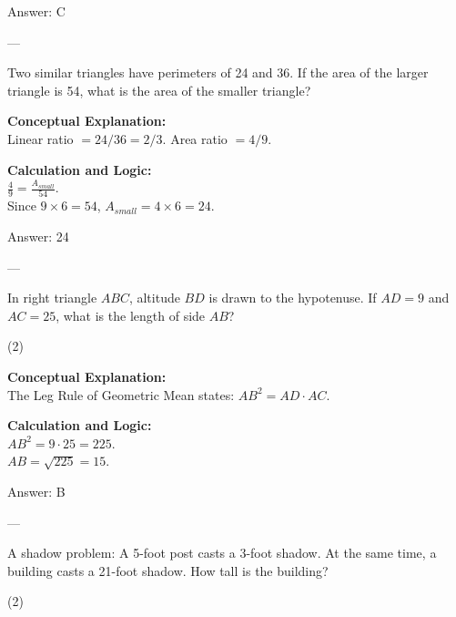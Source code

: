 \documentclass[11pt,paper=a4,answers]{exam}
\begin{document}
\begin{questions}
\begin{solution}
\vspace{15pt}
Answer: \colorbox{yellow!100}{C}
\end{solution}

---

\question
Two similar triangles have perimeters of 24 and 36. If the area of the larger triangle is 54, what is the area of the smaller triangle?

\begin{solution}
\textbf{Conceptual Explanation:} \\
Linear ratio $= 24/36 = 2/3$. Area ratio $= 4/9$.

\vspace{10pt}
\textbf{Calculation and Logic:} \\
$\frac{4}{9} = \frac{A_{small}}{54}$. \\
Since $9 \times 6 = 54$, $A_{small} = 4 \times 6 = 24$.

\vspace{15pt}
Answer: \colorbox{yellow!100}{24}
\end{solution}

---

\question
In right triangle $ABC$, altitude $BD$ is drawn to the hypotenuse. If $AD = 9$ and $AC = 25$, what is the length of side $AB$?
\begin{tasks}(2)
\end{tasks}

\begin{solution}
\textbf{Conceptual Explanation:} \\
The Leg Rule of Geometric Mean states: $AB^2 = AD \cdot AC$.

\vspace{10pt}
\textbf{Calculation and Logic:} \\
$AB^2 = 9 \cdot 25 = 225$. \\
$AB = \sqrt{225} = 15$.

\vspace{15pt}
Answer: \colorbox{yellow!100}{B}
\end{solution}

---

\question
A shadow problem: A 5-foot post casts a 3-foot shadow. At the same time, a building casts a 21-foot shadow. How tall is the building?
\begin{tasks}(2)
\end{tasks}


\end{questions}
\end{document}
